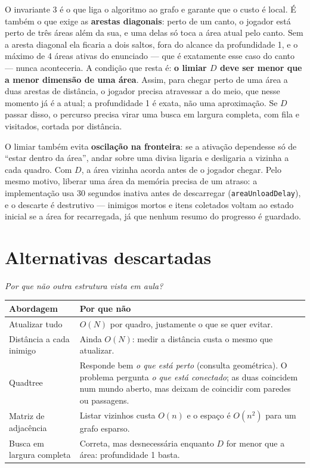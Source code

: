 \documentclass[11pt,a4paper]{article}
\newcommand{\gancho}[1]{\textcolor{destaque}{\textit{#1}}\par}
\begin{document}
O invariante 3 é o que liga o algoritmo ao grafo e garante que o custo é local.
É também o que exige as \textbf{arestas diagonais}: perto de um canto, o
jogador está perto de três áreas além da sua, e uma delas só toca a área atual
pelo canto. Sem a aresta diagonal ela ficaria a dois saltos, fora do alcance da
profundidade 1, e o máximo de 4 áreas ativas do enunciado --- que é exatamente
esse caso do canto --- nunca aconteceria. A condição que resta é: \textbf{o limiar $D$ deve ser menor que a menor
dimensão de uma área}. Assim, para chegar perto de uma área a duas arestas de
distância, o jogador precisa atravessar a do meio, que nesse momento já é a
atual; a profundidade 1 é exata, não uma aproximação. Se $D$ passar disso, o
percurso precisa virar uma busca em largura completa, com fila e visitados,
cortada por distância.

O limiar também evita \textbf{oscilação na fronteira}: se a ativação dependesse
só de ``estar dentro da área'', andar sobre uma divisa ligaria e desligaria a
vizinha a cada quadro. Com $D$, a área vizinha acorda antes de o jogador chegar.
Pelo mesmo motivo, liberar uma área da memória precisa de um atraso: a
implementação usa 30 segundos inativa antes de descarregar (\texttt{areaUnloadDelay}),
e o descarte é destrutivo --- inimigos mortos e itens coletados voltam ao
estado inicial se a área for recarregada, já que nenhum resumo do progresso é
guardado.

\section{Alternativas descartadas}

\gancho{Por que não outra estrutura vista em aula?}

\begin{center}
\begin{tabularx}{\textwidth}{@{}lX@{}}
\toprule
Abordagem & Por que não \\
\midrule
Atualizar tudo & $O(N)$ por quadro, justamente o que se quer evitar. \\
Distância a cada inimigo & Ainda $O(N)$: medir a distância custa o mesmo que atualizar. \\
Quadtree & Responde bem \emph{o que está perto} (consulta geométrica). O problema
  pergunta \emph{o que está conectado}; as duas coincidem num mundo aberto, mas
  deixam de coincidir com paredes ou passagens. \\
Matriz de adjacência & Listar vizinhos custa $O(n)$ e o espaço é $O(n^2)$ para
  um grafo esparso. \\
Busca em largura completa & Correta, mas desnecessária enquanto $D$ for menor
  que a área: profundidade 1 basta. \\
\bottomrule
\end{tabularx}
\end{center}
\end{document}
